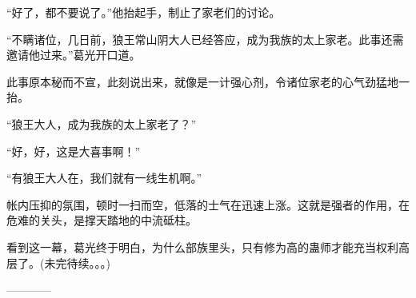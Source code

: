 \begin{this_body}
“好了，都不要说了。”他抬起手，制止了家老们的讨论。

“不瞒诸位，几日前，狼王常山阴大人已经答应，成为我族的太上家老。此事还需邀请他过来。”葛光开口道。

此事原本秘而不宣，此刻说出来，就像是一计强心剂，令诸位家老的心气劲猛地一抬。

“狼王大人，成为我族的太上家老了？”

“好，好，这是大喜事啊！”

“有狼王大人在，我们就有一线生机啊。”

帐内压抑的氛围，顿时一扫而空，低落的士气在迅速上涨。这就是强者的作用，在危难的关头，是撑天踏地的中流砥柱。

看到这一幕，葛光终于明白，为什么部族里头，只有修为高的蛊师才能充当权利高层了。(未完待续。。。)

------------

\end{this_body}

